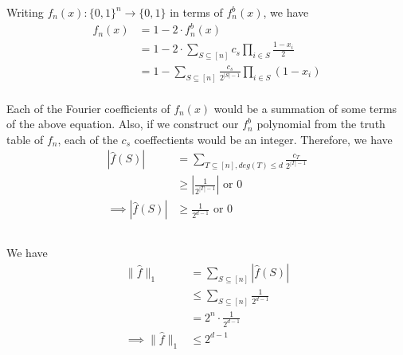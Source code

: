 \documentclass{article}
\begin{document}
\noindent
Writing $f_n(x): {\{0, 1\}}^n \rightarrow \{0, 1\}$ in terms of $f^b_n(x)$, we have
\begin{align*}
	f_n(x) &= 1 - 2 \cdot f^b_n(x) \\
	&= 1 - 2 \cdot \sum_{S \subseteq [n]} c_s \prod_{i \in S} \frac{1 - x_i}{2} \\
	&= 1 - \sum_{S \subseteq [n]} \frac{c_s}{2^{|S|- 1}} \prod_{i \in S} (1 - x_i) \\
\end{align*}

\noindent
Each of the Fourier coefficients of $f_n(x)$ would be a summation of some terms of the above equation. Also, if we construct our $f_n^b$ polynomial from the truth table of $f_n$, each of the $c_s$ coeffectients would be an integer. Therefore, we have
\begin{align*}
	|\widehat{f}(S)| &= \sum_{T \subseteq [n], deg(T) \leq d} \frac{c_T}{2^{|T|- 1}} \\
	&\geq |\frac{1}{2^{|T|- 1}}| \text{ or } 0 \\
\implies |\widehat{f}(S)| &\geq \frac{1}{2^{d-1}} \text{ or } 0 \\
\end{align*}
\vspace*{-16mm}\begin{flushright}\qedsymbol\end{flushright}


\subsubsection{}
\vspace*{-8mm}

We have
\begin{align*}
	\|\widehat{f}\|_1 &= \sum_{S \subseteq [n]} |\widehat{f}(S)| \\
	&\leq \sum_{S \subseteq [n]} \frac{1}{2^{d-1}} \\
	&= 2^n \cdot \frac{1}{2^{d-1}} \\
\implies \|\widehat{f}\|_1 &\leq 2^{d-1} \\
\end{align*}
\vspace*{-16mm}\begin{flushright}\qedsymbol\end{flushright}
\end{document}
